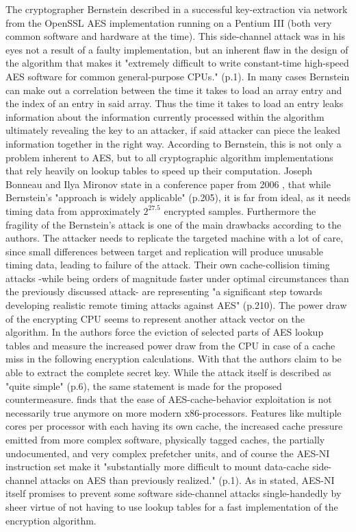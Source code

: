 The cryptographer Bernstein described in \cite{bernsteincache} a successful key-extraction via network from the OpenSSL \ac{AES} implementation running on a Pentium III (both very common software and hardware at the time). This side-channel attack was in his eyes not a result of a faulty implementation, but an inherent flaw in the design of the algorithm that makes it "extremely difficult to write constant-time high-speed \ac{AES} software for common general-purpose CPUs." (p.1). In many cases Bernstein can make out a correlation between the time it takes to load an array entry and the index of an entry in said array. Thus the time it takes to load an entry leaks information about the information currently processed within the algorithm ultimately revealing the key to an attacker, if said attacker can piece the leaked information together in the right way.
According to Bernstein, this is not only a problem inherent to \ac{AES}, but to all cryptographic algorithm implementations that rely heavily on lookup tables to speed up their computation.
Joseph Bonneau and Ilya Mironov state in a conference paper from 2006  \cite{improvedcache}, that while Bernstein's "approach is widely applicable" (p.205), it is far from ideal, as it needs timing data from approximately $2^{27.5}$ encrypted samples. Furthermore the fragility of the Bernstein's attack is one of the main drawbacks according to the authors. The attacker needs to replicate the targeted machine with a lot of care, since small differences between target and replication will produce unusable timing data, leading to failure of the attack. Their own cache-collision timing attacks -while being orders of magnitude faster under optimal circumstances than the previously discussed attack- are representing "a significant step towards developing realistic remote timing attacks against AES" (p.210).
The power draw of the encrypting CPU seems to represent another attack vector on the algorithm. In \cite{powerdraw} the authors force the eviction of selected parts of \ac{AES} lookup tables and measure the increased power draw from the CPU in case of a cache miss in the following encryption calculations. With that the authors claim to be able to extract the complete secret key. While the attack itself is described as "quite simple" (p.6), the same statement is made for the proposed countermeasure.
\cite{ctattacksfeasible} finds that the ease of \ac{AES}-cache-behavior exploitation is not necessarily true anymore on more modern x86-processors. Features like multiple cores per processor with each having its own cache, the increased cache pressure emitted from more complex software, physically tagged caches, the partially undocumented, and very complex prefetcher units, and of course the \ac{AES-NI} instruction set make it "substantially more difficult to mount data-cache side-channel attacks on \ac{AES} than previously realized." (p.1). As in \cite{aes-ni} stated, \ac{AES-NI} itself promises to prevent some software side-channel attacks single-handedly by sheer virtue of not having to use lookup tables for a fast implementation of the encryption algorithm.
